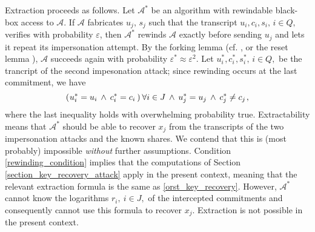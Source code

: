 \documentclass{iacrtrans}
\begin{document}
Extraction proceeds as follows.
Let $\mathcal{A}^*$ be an algorithm with rewindable
black-box access to $\mathcal{A}$.
If $\mathcal{A}$ fabricates
$u_j,\hspace{2pt} s_j$ such that
the transcript $u_i, c_i, s_i,\hspace{2pt} i \in Q,$
verifies with probability $\varepsilon$,
then $\mathcal{A}^*$ rewinds $\mathcal{A}$
exactly before sending $u_j$ and
lets it repeat its impersonation attempt.
By the forking lemma
(cf. \cite{paper_bellare_musig},
or the reset lemma \cite{paper_bellare_palacio}),
$\mathcal{A}$ succeeds again with probability
$\varepsilon^* \approx \varepsilon ^ 2$.
Let $u_i^*, c_i^*, s_i^*,\hspace{2pt}i \in Q,$ be the
trancript of the second impesonation attack;
since rewinding occurs at the last commitment, we have
\vspace{3pt}
\begin{equation}\label{rewinding_condition}
(
	\hspace{0.5pt}
	u_i^* = u_i
	\hspace{2pt}
	\land
	\hspace{2pt}
	c_i^* = c_i
	\hspace{2pt}
)\hspace{2pt}\forall i \in J
\hspace{2pt}
\land
\hspace{2pt}
u_j^* = u_j
\hspace{2pt}
\land
\hspace{2pt}
c_j^* \neq c_j\hspace{1pt},
\vspace{3pt}
\end{equation}
where the last inequality holds with overwhelming probability true.
Extractability means that
$\mathcal{A}^*$ should be able to recover $x_j$
from the transcripts of the two
impersonation attacks and the known shares.
We contend that this is (most probably) impossible
\textit{without} further assumptions.
Condition \eqref{rewinding_condition} implies that the
computations of Section \ref{section_key_recovery_attack}
apply in the present context,
meaning that the relevant extraction
formula is the same as \eqref{orst_key_recovery}.
However, $\mathcal{A}^*$
cannot know the logarithms $r_i,\ i \in J,$
of the intercepted commitments
and consequently cannot use
this formula to recover $x_j$.
Extraction is not possible in the present context.
\end{document}
